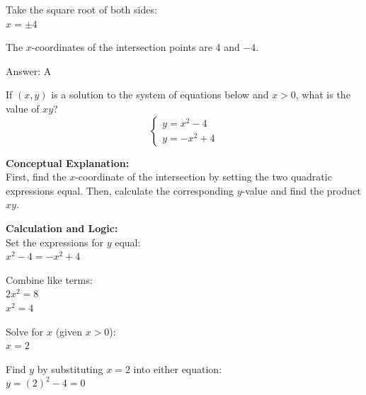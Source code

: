 \documentclass[11pt,paper=a4,answers]{exam}
\begin{document}
\begin{questions}
\begin{solution}
\vspace{10pt}

Take the square root of both sides: \\
$x = \pm 4$

\vspace{10pt}

The $x$-coordinates of the intersection points are 4 and $-4$.

\vspace{25pt}

Answer: \colorbox{yellow!100}{A}
\end{solution}

\vspace{40pt}

\question
If $(x, y)$ is a solution to the system of equations below and $x > 0$, what is the value of $xy$?
\[ \begin{cases} y = x^2 - 4 \\ y = -x^2 + 4 \end{cases} \]

\begin{solution}
\textbf{Conceptual Explanation:} \\
First, find the $x$-coordinate of the intersection by setting the two quadratic expressions equal. Then, calculate the corresponding $y$-value and find the product $xy$.

\vspace{20pt}

\textbf{Calculation and Logic:} \\
Set the expressions for $y$ equal: \\
$x^2 - 4 = -x^2 + 4$

\vspace{10pt}

Combine like terms: \\
$2x^2 = 8$ \\
$x^2 = 4$

\vspace{10pt}

Solve for $x$ (given $x > 0$): \\
$x = 2$

\vspace{10pt}

Find $y$ by substituting $x = 2$ into either equation: \\
$y = (2)^2 - 4 = 0$

\vspace{10pt}


\end{solution}
\end{questions}
\end{document}
